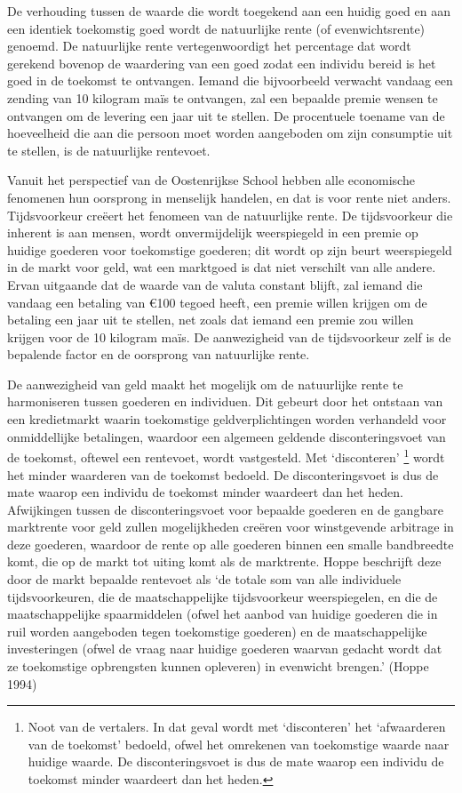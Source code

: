 \documentclass[
  a5paper,
  smalldemyvopaper,11pt,twoside,onecolumn,openright,extrafontsizes,
hidelinks]{memoir}
\begin{document}
De verhouding tussen de waarde die wordt toegekend aan een huidig goed
en aan een identiek toekomstig goed wordt de natuurlijke rente (of
evenwichtsrente) genoemd. De natuurlijke rente vertegenwoordigt het
percentage dat wordt gerekend bovenop de waardering van een goed zodat
een individu bereid is het goed in de toekomst te ontvangen. Iemand die
bijvoorbeeld verwacht vandaag een zending van 10 kilogram maïs te
ontvangen, zal een bepaalde premie wensen te ontvangen om de levering
een jaar uit te stellen. De procentuele toename van de hoeveelheid die
aan die persoon moet worden aangeboden om zijn consumptie uit te
stellen, is de natuurlijke rentevoet.

Vanuit het perspectief van de Oostenrijkse School hebben alle
economische fenomenen hun oorsprong in menselijk handelen, en dat is
voor rente niet anders. Tijdsvoorkeur creëert het fenomeen van de
natuurlijke rente. De tijdsvoorkeur die inherent is aan mensen, wordt
onvermijdelijk weerspiegeld in een premie op huidige goederen voor
toekomstige goederen; dit wordt op zijn beurt weerspiegeld in de markt
voor geld, wat een marktgoed is dat niet verschilt van alle andere.
Ervan uitgaande dat de waarde van de valuta constant blijft, zal iemand
die vandaag een betaling van €100 tegoed heeft, een premie willen
krijgen om de betaling een jaar uit te stellen, net zoals dat iemand een
premie zou willen krijgen voor de 10 kilogram maïs. De aanwezigheid van
de tijdsvoorkeur zelf is de bepalende factor en de oorsprong van
natuurlijke rente.

De aanwezigheid van geld maakt het mogelijk om de natuurlijke rente te
harmoniseren tussen goederen en individuen. Dit gebeurt door het
ontstaan van een kredietmarkt waarin toekomstige geldverplichtingen
worden verhandeld voor onmiddellijke betalingen, waardoor een algemeen
geldende disconteringsvoet van de toekomst, oftewel een rentevoet, wordt
vastgesteld. Met `disconteren' \footnote{Noot van de vertalers. In dat
  geval wordt met `disconteren' het `afwaarderen van de toekomst'
  bedoeld, ofwel het omrekenen van toekomstige waarde naar huidige
  waarde. De disconteringsvoet is dus de mate waarop een individu de
  toekomst minder waardeert dan het heden.} wordt het minder waarderen
van de toekomst bedoeld. De disconteringsvoet is dus de mate waarop een
individu de toekomst minder waardeert dan het heden. Afwijkingen tussen
de disconteringsvoet voor bepaalde goederen en de gangbare marktrente
voor geld zullen mogelijkheden creëren voor winstgevende arbitrage in
deze goederen, waardoor de rente op alle goederen binnen een smalle
bandbreedte komt, die op de markt tot uiting komt als de marktrente.
Hoppe beschrijft deze door de markt bepaalde rentevoet als `de totale
som van alle individuele tijdsvoorkeuren, die de maatschappelijke
tijdsvoorkeur weerspiegelen, en die de maatschappelijke spaarmiddelen
(ofwel het aanbod van huidige goederen die in ruil worden aangeboden
tegen toekomstige goederen) en de maatschappelijke investeringen (ofwel
de vraag naar huidige goederen waarvan gedacht wordt dat ze toekomstige
opbrengsten kunnen opleveren) in evenwicht brengen.' (Hoppe 1994)
\end{document}
